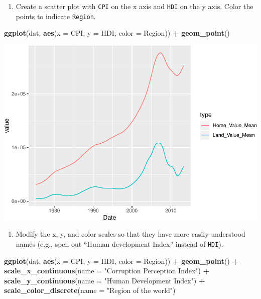 \documentclass[
]{book}
\newenvironment{Shaded}{\begin{snugshade}}{\end{snugshade}}
\newcommand{\DataTypeTok}[1]{\textcolor[rgb]{0.13,0.29,0.53}{#1}}
\newcommand{\KeywordTok}[1]{\textcolor[rgb]{0.13,0.29,0.53}{\textbf{#1}}}
\newcommand{\NormalTok}[1]{#1}
\newcommand{\OperatorTok}[1]{\textcolor[rgb]{0.81,0.36,0.00}{\textbf{#1}}}
\newcommand{\StringTok}[1]{\textcolor[rgb]{0.31,0.60,0.02}{#1}}
\providecommand{\tightlist}{%
  \setlength{\itemsep}{0pt}\setlength{\parskip}{0pt}}
\begin{document}
\begin{alert}

\begin{enumerate}
\def\labelenumi{\arabic{enumi}.}
\tightlist
\item
  Create a scatter plot with \texttt{CPI} on the x axis and \texttt{HDI} on the y axis. Color the points to indicate \texttt{Region}.
\end{enumerate}

\begin{Shaded}
\begin{Highlighting}[]
\KeywordTok{ggplot}\NormalTok{(dat, }\KeywordTok{aes}\NormalTok{(}\DataTypeTok{x =}\NormalTok{ CPI, }\DataTypeTok{y =}\NormalTok{ HDI, }\DataTypeTok{color =}\NormalTok{ Region)) }\OperatorTok{+}
\StringTok{  }\KeywordTok{geom\_point}\NormalTok{()}
\end{Highlighting}
\end{Shaded}

\includegraphics{R/Rgraphics/figures/unnamed-chunk-189-1.pdf}

\begin{enumerate}
\def\labelenumi{\arabic{enumi}.}
\setcounter{enumi}{1}
\tightlist
\item
  Modify the x, y, and color scales so that they have more easily-understood names (e.g., spell out ``Human development Index'' instead of \texttt{HDI}).
\end{enumerate}

\begin{Shaded}
\begin{Highlighting}[]
\KeywordTok{ggplot}\NormalTok{(dat, }\KeywordTok{aes}\NormalTok{(}\DataTypeTok{x =}\NormalTok{ CPI, }\DataTypeTok{y =}\NormalTok{ HDI, }\DataTypeTok{color =}\NormalTok{ Region)) }\OperatorTok{+}
\StringTok{  }\KeywordTok{geom\_point}\NormalTok{() }\OperatorTok{+}
\StringTok{  }\KeywordTok{scale\_x\_continuous}\NormalTok{(}\DataTypeTok{name =} \StringTok{"Corruption Perception Index"}\NormalTok{) }\OperatorTok{+}
\StringTok{  }\KeywordTok{scale\_y\_continuous}\NormalTok{(}\DataTypeTok{name =} \StringTok{"Human Development Index"}\NormalTok{) }\OperatorTok{+}
\StringTok{  }\KeywordTok{scale\_color\_discrete}\NormalTok{(}\DataTypeTok{name =} \StringTok{"Region of the world"}\NormalTok{)}
\end{Highlighting}
\end{Shaded}


\end{alert}
\end{document}
